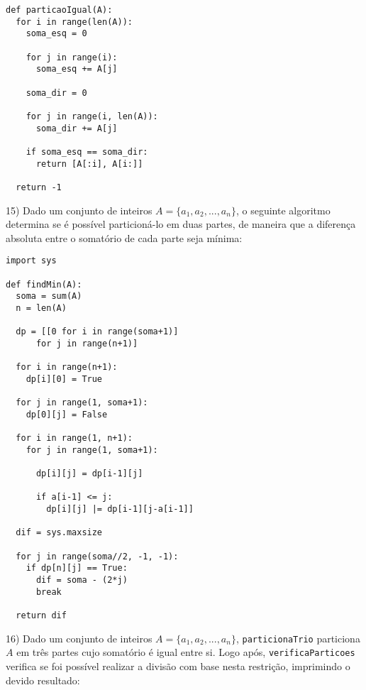 \documentclass[]{article}
\begin{document}
\begin{lstlisting}
def particaoIgual(A):
  for i in range(len(A)):
    soma_esq = 0
        
    for j in range(i):
      soma_esq += A[j]
 
    soma_dir = 0
        
    for j in range(i, len(A)):
      soma_dir += A[j]
 
    if soma_esq == soma_dir:
      return [A[:i], A[i:]]
 
  return -1
\end{lstlisting}

\newpage

15) Dado um conjunto de inteiros $A = \{a_1, a_2, ..., a_n\}$, o seguinte algoritmo determina se é possível particioná-lo em duas partes, de maneira que a diferença absoluta entre o somatório de cada parte seja mínima:

\begin{lstlisting}
import sys

def findMin(A):
  soma = sum(A)
  n = len(A)

  dp = [[0 for i in range(soma+1)] 
      for j in range(n+1)]

  for i in range(n+1):
    dp[i][0] = True
    
  for j in range(1, soma+1):
    dp[0][j] = False
  
  for i in range(1, n+1):
    for j in range(1, soma+1):
      
      dp[i][j] = dp[i-1][j]
      
      if a[i-1] <= j:
        dp[i][j] |= dp[i-1][j-a[i-1]]
  
  dif = sys.maxsize

  for j in range(soma//2, -1, -1):
    if dp[n][j] == True:
      dif = soma - (2*j)
      break
      
  return dif
\end{lstlisting}

\newpage

16) Dado um conjunto de inteiros $A = \{a_1, a_2, ..., a_n\}$, \texttt{particionaTrio} particiona $A$ em três partes cujo somatório é igual entre si. Logo após, \texttt{verificaParticoes} verifica se foi possível realizar a divisão com base nesta restrição, imprimindo o devido resultado:
\end{document}
